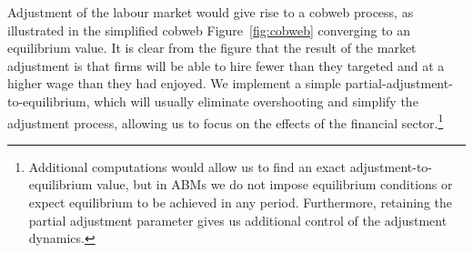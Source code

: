 Adjustment of the labour market would give rise to  a cobweb process, as illustrated in the simplified cobweb Figure~\ref{fig:cobweb} converging to an equilibrium value. It is clear from the figure that the result of the market adjustment is that firms will be able to hire fewer than they targeted and at a higher wage than they had enjoyed. We implement a  simple partial-adjustment-to-equilibrium, which  will usually eliminate  overshooting and simplify the adjustment process, allowing us to focus on the effects of the financial sector.\footnote{%
Additional computations would allow us to find an exact adjustment-to-equilibrium value, but in ABMs we  do not impose equilibrium conditions or expect equilibrium to be achieved in any period. Furthermore, retaining the partial adjustment parameter gives us additional control of the adjustment dynamics.} 

